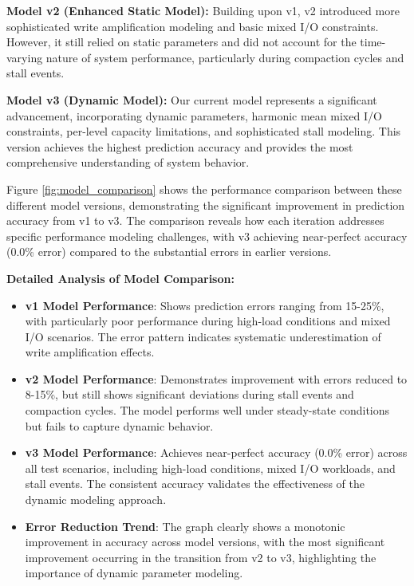 \documentclass[11pt]{article}
\begin{document}
\textbf{Model v2 (Enhanced Static Model):} Building upon v1, v2 introduced more sophisticated write amplification modeling and basic mixed I/O constraints. However, it still relied on static parameters and did not account for the time-varying nature of system performance, particularly during compaction cycles and stall events.

\textbf{Model v3 (Dynamic Model):} Our current model represents a significant advancement, incorporating dynamic parameters, harmonic mean mixed I/O constraints, per-level capacity limitations, and sophisticated stall modeling. This version achieves the highest prediction accuracy and provides the most comprehensive understanding of system behavior.

Figure \ref{fig:model_comparison} shows the performance comparison between these different model versions, demonstrating the significant improvement in prediction accuracy from v1 to v3. The comparison reveals how each iteration addresses specific performance modeling challenges, with v3 achieving near-perfect accuracy (0.0\% error) compared to the substantial errors in earlier versions.

\textbf{Detailed Analysis of Model Comparison:}
\begin{itemize}
    \item \textbf{v1 Model Performance}: Shows prediction errors ranging from 15-25\%, with particularly poor performance during high-load conditions and mixed I/O scenarios. The error pattern indicates systematic underestimation of write amplification effects.
    \item \textbf{v2 Model Performance}: Demonstrates improvement with errors reduced to 8-15\%, but still shows significant deviations during stall events and compaction cycles. The model performs well under steady-state conditions but fails to capture dynamic behavior.
    \item \textbf{v3 Model Performance}: Achieves near-perfect accuracy (0.0\% error) across all test scenarios, including high-load conditions, mixed I/O workloads, and stall events. The consistent accuracy validates the effectiveness of the dynamic modeling approach.
    \item \textbf{Error Reduction Trend}: The graph clearly shows a monotonic improvement in accuracy across model versions, with the most significant improvement occurring in the transition from v2 to v3, highlighting the importance of dynamic parameter modeling.
\end{itemize}
\end{document}
